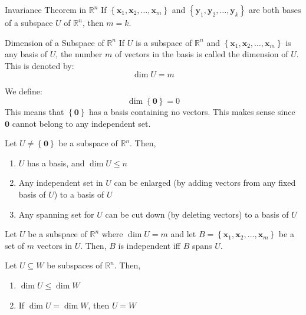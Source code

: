 \documentclass[12pt]{article}
\begin{document}
\begin{theorem}{Invariance Theorem in $ \mathbb{R}^n $}{}
    If $ \left\{ \mathbf{x}_1, \mathbf{x}_2, \dots, \mathbf{x}_m \right\} $ and $ \left\{ \mathbf{y}_1, \mathbf{y}_2, \dots, \mathbf{y}_k \right\} $ are both bases of a subspace $ U $ of $ \mathbb{R}^n $, then $ m = k $.
\end{theorem}

\begin{definition}{Dimension of a Subspace of $ \mathbb{R}^n $}{}
    If $ U $ is a subspace of $ \mathbb{R}^n $ and $ \left\{ \mathbf{x}_1, \mathbf{x}_2, \dots, \mathbf{x}_m \right\} $ is any basis of $ U $, the number $ m $ of vectors in the basis is called the dimension of $ U $. This is denoted by:
    \[ \dim U = m \]
\end{definition}

\begin{note}{}{}
    We define:
    \[ \dim \left\{ \mathbf{0} \right\} = 0 \]
    This means that $ \left\{ \mathbf{0} \right\} $ has a basis containing no vectors. This makes sense since $ \mathbf{0} $ cannot belong to any independent set.
\end{note}

\begin{theorem}{}{}
    Let $ U \neq \left\{ \mathbf{0} \right\} $ be a subspace of $ \mathbb{R}^n $. Then,
    \begin{enumerate}
        \item $ U $ has a basis, and $ \dim U \leq n $
        \item Any independent set in $ U $ can be enlarged (by adding vectors from any fixed basis of $ U $) to a basis of $ U $
        \item Any spanning set for $ U $ can be cut down (by deleting vectors) to a basis of $ U $
    \end{enumerate}
\end{theorem}

\begin{theorem}{}{}
    Let $ U $ be a subspace of $ \mathbb{R}^n $ where $ \dim U = m $ and let $ B = \left\{ \mathbf{x}_1, \mathbf{x}_2, \dots, \mathbf{x}_m \right\} $ be a set of $ m $ vectors in $ U $. Then, $ B $ is independent iff $ B $ spans $ U $.
\end{theorem}

\begin{theorem}{}{}
    Let $ U \subseteq W $ be subspaces of $ \mathbb{R}^n $. Then,
    \begin{enumerate}
        \item $ \dim U \leq \dim W $
        \item If $ \dim U = \dim W $, then $ U = W $
    \end{enumerate}
\end{theorem}
\end{document}
